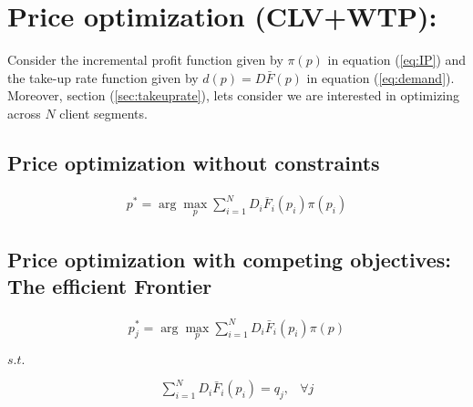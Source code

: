 \chapter{Price optimization (CLV+WTP): }

Consider the incremental profit function given by $\pi(p)$ in equation (\ref{eq:IP}) and the take-up rate function given by $d(p)=D\bar{F}(p)$ in equation (\ref{eq:demand}). Moreover, section (\ref{sec:takeuprate}), lets consider we are interested in optimizing across $N$ client segments.
\section{Price optimization without constraints}
\begin{align}
p^*= \arg \max_p \sum_{i=1}^N D_i\overline{F}_i(p_i)\pi(p_i)
\end{align}

\section{Price optimization with competing objectives: The efficient Frontier}

\begin{align}
p^*_j= \arg \max_p \sum_{i=1}^N D_i\bar{F}_i(p_i)\pi(p)
\end{align}
\begin{center}
    $s.t.$
\end{center}
\begin{align}
\sum_{i=1}^N D_i\bar{F}_i(p_i) =q_j,& \forall j
\end{align}